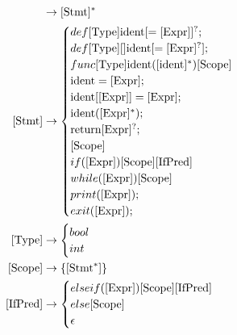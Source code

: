 \documentclass{article}
\begin{document}
\begin{align}
	[\text{Prog}]    & \to [\text{Stmt}]^*
	\\
	[\text{Stmt}]    & \to
	\begin{cases}
		def \space [\text{Type}] \space \text{ident} \space [= [\text{Expr}]]^?;          \\
		def \space [\text{Type}][] \space \text{ident} \space [= \space [\text{Expr}]^?]; \\
		func \space [\text{Type}] \space \text{ident}([\text{ident}]^*)[\text{Scope}]     \\
		\text{ident} = [\text{Expr}];                                                     \\
		\text{ident}[\text{[Expr]}] = [\text{Expr}];                                      \\
		\text{ident}([\text{Expr}]^*);                                                    \\
		\text{return} \space [\text{Expr}]^?;                                             \\
		[\text{Scope}]                                                                    \\
		if([\text{Expr}])[\text{Scope}][\text{IfPred}]                                    \\
		while([\text{Expr}])[\text{Scope}]                                                \\
		print(\text{[Expr]});                                                             \\
		exit([\text{Expr}]);                                                              \\
	\end{cases}
	\\
	[\text{Type}]    & \to
	\begin{cases}
		bool \\
		int  \\
	\end{cases}
	\\
	[\text{Scope}]   & \to \{[\text{Stmt}^*]\}
	\\
	[\text{IfPred}]  & \to \begin{cases}
		                       elseif([\text{Expr}])[\text{Scope}][\text{IfPred}] \\
		                       else[\text{Scope}]                                 \\
		                       \epsilon
	                       \end{cases} \\

\end{align}
\end{document}
